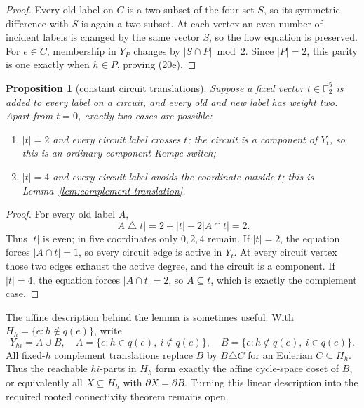 \documentclass[11pt]{article}
\newtheorem{proposition}[theorem]{Proposition}
\theoremstyle{definition}
\theoremstyle{remark}
\newcommand{\F}{\mathbb F}
\begin{document}
\begin{proof}
Every old label on \(C\) is a two-subset of the four-set \(S\), so its
symmetric difference with \(S\) is again a two-subset.  At each vertex an
even number of incident labels is changed by the same vector \(S\), so the
flow equation is preserved.  For \(e\in C\), membership in \(Y_P\) changes
by \(|S\cap P|\bmod2\).  Since \(|P|=2\), this parity is one exactly when
\(h\in P\), proving (20e).
\end{proof}

\begin{proposition}[constant circuit translations]
Suppose a fixed vector \(t\in\F_2^5\) is added to every label on a circuit,
and every old and new label has weight two.  Apart from \(t=0\), exactly two
cases are possible:
\begin{enumerate}
 \item \(|t|=2\) and every circuit label crosses \(t\); the circuit is a
 component of \(Y_t\), so this is an ordinary component Kempe switch;
 \item \(|t|=4\) and every circuit label avoids the coordinate outside
 \(t\); this is Lemma~\ref{lem:complement-translation}.
\end{enumerate}
\end{proposition}

\begin{proof}
For every old label \(A\),
\[
       |A\mathbin\triangle t|=2+|t|-2|A\cap t|=2.
\]
Thus \(|t|\) is even; in five coordinates only \(0,2,4\) remain.  If \(|t|=2\),
the equation forces \(|A\cap t|=1\), so every circuit edge is active in
\(Y_t\).  At every circuit vertex those two edges exhaust the active degree,
and the circuit is a component.  If \(|t|=4\), the equation forces
\(|A\cap t|=2\), so \(A\subseteq t\), which is exactly the complement case.
\end{proof}

The affine description behind the lemma is sometimes useful.  With
\(H_h=\{e:h\notin q(e)\}\), write
\[
 Y_{hi}=A\cup B,
 \quad A=\{e:h\in q(e),\ i\notin q(e)\},
 \quad B=\{e:h\notin q(e),\ i\in q(e)\}.
\]
All fixed-\(h\) complement translations replace \(B\) by \(B\triangle C\)
for an Eulerian \(C\subseteq H_h\).  Thus the reachable \(hi\)-parts in
\(H_h\) form exactly the affine cycle-space coset of \(B\), or equivalently
all \(X\subseteq H_h\) with \(\partial X=\partial B\).  Turning this linear
description into the required rooted connectivity theorem remains open.
\end{document}
